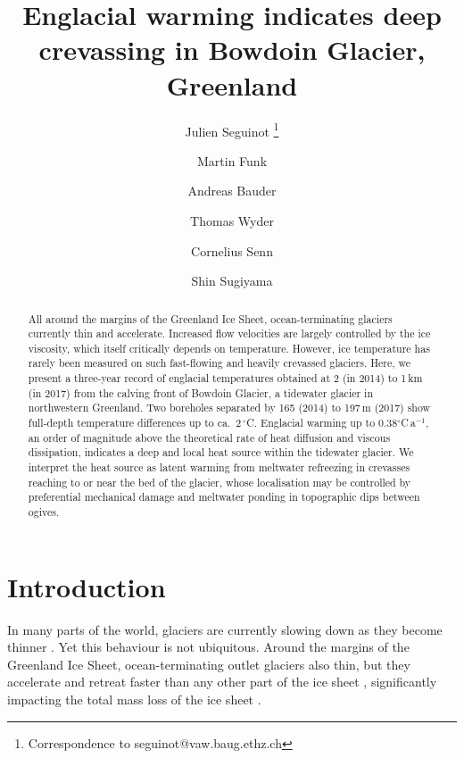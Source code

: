 \documentclass[utf8]{article}
\title{Englacial warming indicates deep crevassing
       in Bowdoin Glacier, Greenland}
\author[1]{Julien Seguinot
           \thanks{Correspondence to seguinot@vaw.baug.ethz.ch}}
\author[1]{Martin Funk}
\author[1]{Andreas Bauder}
\author[1]{Thomas Wyder}
\author[2]{Cornelius Senn}
\author[3]{Shin Sugiyama}
\affil[1]{Laboratory of Hydraulics, Hydrology and Glaciology,
          ETH Zürich, Switzerland}
\affil[2]{Department of Civil, Environmental and Geomatic Engineering,
          ETH Zürich, Switzerland}
\affil[3]{Institute of Low Temperature Science, Hokkaido University,
          Sapporo, Japan}
\begin{document}

\maketitle

\begin{abstract}

    All around the margins of the Greenland Ice Sheet, ocean-terminating
    glaciers currently thin and accelerate. Increased flow velocities are
    largely controlled by the ice viscosity, which itself critically depends
    on temperature. However, ice temperature has rarely
    been measured on such fast-flowing and heavily crevassed glaciers.
    Here, we present a three-year record of englacial temperatures obtained at
    2 (in 2014) to 1\,km (in 2017) from the calving front of Bowdoin Glacier, a
    tidewater glacier in northwestern Greenland. Two boreholes separated by 165
    (2014) to 197\,m (2017) show full-depth
    temperature differences up to ca.~2\,$^\circ$C. Englacial warming up to
    0.38$^\circ$C\,a$^{-1}$, an order of magnitude above the theoretical rate
    of heat diffusion and viscous dissipation, indicates a deep and local heat
    source within the tidewater glacier.
    We interpret the heat source as latent warming from meltwater refreezing in
    crevasses reaching to or near the bed of the glacier, whose localisation
    may be controlled by preferential mechanical damage and meltwater ponding
    in topographic dips between ogives.

\end{abstract}

\section{Introduction}

    In many parts of the world, glaciers are currently slowing down as they
    become thinner \citep{Heid.Kaab.2012, Dehecq.etal.2018}. Yet this behaviour
    is not ubiquitous. Around the margins of
    the Greenland Ice Sheet, ocean-terminating outlet glaciers also thin, but
    they accelerate and retreat faster than any other part of the ice sheet
    \citep[e.g.,][]{Krabill.etal.2000, Rignot.Kanagaratnam.2006,
    Pritchard.etal.2009, Hill.etal.2017}, significantly impacting the total
    mass loss of the ice sheet \citep[e.g.,][]{Enderlin.etal.2014,
    Khan.etal.2015, McMillan.etal.2016}.
\end{document}
